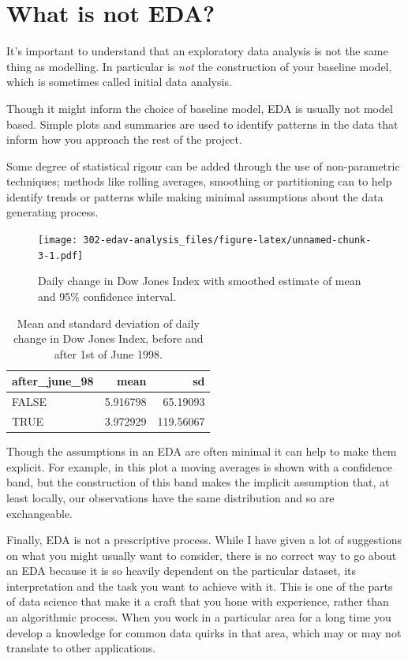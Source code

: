 \documentclass[
  12pt,
]{book}
\begin{document}
\hypertarget{what-is-not-eda}{%
\section{What is not EDA?}\label{what-is-not-eda}}

It's important to understand that an exploratory data analysis is not the same thing as modelling. In particular is \emph{not} the construction of your baseline model, which is sometimes called initial data analysis.

Though it might inform the choice of baseline model, EDA is usually not model based. Simple plots and summaries are used to identify patterns in the data that inform how you approach the rest of the project.

Some degree of statistical rigour can be added through the use of non-parametric techniques; methods like rolling averages, smoothing or partitioning can to help identify trends or patterns while making minimal assumptions about the data generating process.

\begin{figure}
\centering
\texttt{[image: 302-edav-analysis\_files/figure-latex/unnamed-chunk-3-1.pdf]}
\caption{\label{fig:unnamed-chunk-3}Daily change in Dow Jones Index with smoothed estimate of mean and 95\% confidence interval.}
\end{figure}

\begin{table}

\caption{\label{tab:unnamed-chunk-4}Mean and standard deviation of daily change in Dow Jones Index, before and after 1st of June 1998.}
\centering
\begin{tabular}[t]{l|r|r}
\hline
after\_june\_98 & mean & sd\\
\hline
FALSE & 5.916798 & 65.19093\\
\hline
TRUE & 3.972929 & 119.56067\\
\hline
\end{tabular}
\end{table}

Though the assumptions in an EDA are often minimal it can help to make them explicit. For example, in this plot a moving averages is shown with a confidence band, but the construction of this band makes the implicit assumption that, at least locally, our observations have the same distribution and so are exchangeable.

Finally, EDA is not a prescriptive process. While I have given a lot of suggestions on what you might usually want to consider, there is no correct way to go about an EDA because it is so heavily dependent on the particular dataset, its interpretation and the task you want to achieve with it. This is one of the parts of data science that make it a craft that you hone with experience, rather than an algorithmic process. When you work in a particular area for a long time you develop a knowledge for common data quirks in that area, which may or may not translate to other applications.
\end{document}
